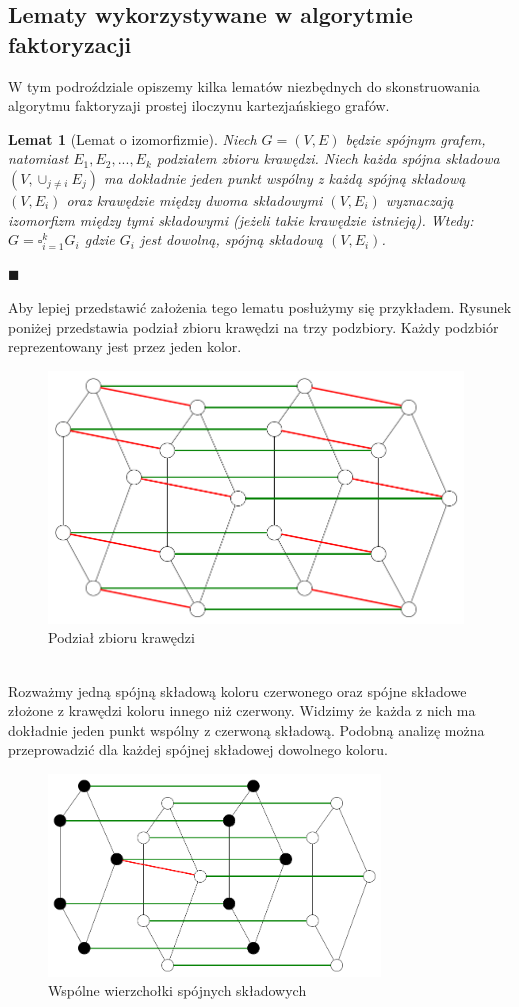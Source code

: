 \documentclass[12pt,a4paper,titlepage]{article}
\newtheorem{lem}[twr]{Lemat}
\newcommand\tab[1][1cm]{\hspace*{#1}}
\begin{document}
\subsection{Lematy wykorzystywane w algorytmie faktoryzacji}
W tym podroździale opiszemy kilka lematów niezbędnych do skonstruowania algorytmu faktoryzaji prostej iloczynu kartezjańskiego grafów.
\begin{lem}[Lemat o izomorfizmie]
Niech $G=(V, E)$ będzie spójnym grafem, natomiast $E_1 , E_2 , ... , E_k$ podziałem zbioru krawędzi. Niech każda spójna składowa $(V, \cup_{j \neq i}E_j)$ ma dokładnie jeden punkt wspólny z każdą spójną składową $(V, E_i)$ oraz krawędzie między dwoma składowymi $(V, E_i)$ wyznaczają izomorfizm między tymi składowymi (jeżeli takie krawędzie istnieją). Wtedy: $G=\square_{i=1}^k G_i $ gdzie $G_i $ jest dowolną, spójną składową $(V, E_i)$.
\end{lem}
\begin{flushright}
$\blacksquare$
\end{flushright}
\tab[0.6cm]Aby lepiej przedstawić założenia tego lematu posłużymy się przykładem. Rysunek poniżej przedstawia podział zbioru krawędzi na trzy podzbiory. Każdy podzbiór reprezentowany jest przez jeden kolor.
\begin{figure}[h]
\centering
\includegraphics[width = 11cm]{graf1.png}
\caption{Podział zbioru krawędzi}
\end{figure}
\\
\tab[0.6cm]Rozważmy jedną spójną składową koloru czerwonego oraz spójne składowe złożone z krawędzi koloru innego niż czerwony. Widzimy że każda z nich ma dokładnie jeden punkt wspólny z czerwoną składową. Podobną analizę można przeprowadzić dla każdej spójnej składowej dowolnego koloru.\\
\begin{figure}[h]
\centering
\includegraphics[width = 8.8cm]{izom1.png}
\caption{Wspólne wierzchołki spójnych składowych}
\end{figure}
\end{document}
